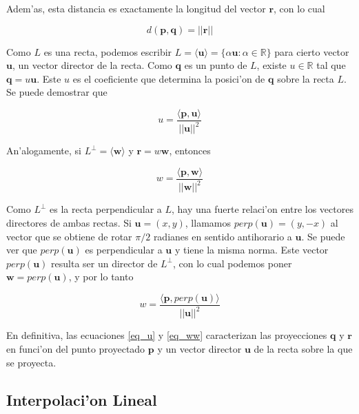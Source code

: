 \noindent
Adem'as, esta distancia es exactamente la longitud del vector $\mathbf{r}$, con lo cual

\begin{equation*}
d(\mathbf{p}, \mathbf{q}) = ||\mathbf{r}||
\label{eq_dist_2}
\end{equation*}

Como $L$ es una recta, podemos escribir $L = \langle \mathbf{u} \rangle = \{\alpha \mathbf{u}: \alpha \in \mathbb{R}\}$ para cierto vector $\mathbf{u}$, un vector director de la recta. Como $\mathbf{q}$ es un punto de $L$, existe $u \in \mathbb{R}$ tal que $\mathbf{q} = u\mathbf{u}$. Este $u$ es el coeficiente que determina la posici'on de $\mathbf{q}$ sobre la recta $L$. Se puede demostrar que 

\begin{equation}
u = \frac{\langle \mathbf{p}, \mathbf{u} \rangle}{||\mathbf{u}||^2}
\label{eq_u}
\end{equation}


An'alogamente, si $L^{\perp} = \langle \mathbf{w} \rangle$ y $\mathbf{r} = w \mathbf{w}$, entonces

\[w = \frac{\langle \mathbf{p}, \mathbf{w}\rangle}{||\mathbf{w}||^2}\]

Como $L^{\perp}$ es la recta perpendicular a $L$, hay una fuerte relaci'on entre los vectores directores de ambas rectas. Si $\mathbf{u} = (x, y)$, llamamos $perp(\mathbf{u}) = (y, -x)$ al vector que se obtiene de rotar $\pi / 2$ radianes en sentido antihorario a $\mathbf{u}$. Se puede ver que $perp(\mathbf{u})$ es perpendicular a $\mathbf{u}$ y tiene la misma norma. Este vector $perp(\mathbf{u})$ resulta ser un director de $L^{\perp}$, con lo cual podemos poner $\mathbf{w} = perp(\mathbf{u})$, y por lo tanto

\begin{equation}
w = \frac{\langle\mathbf{p}, perp(\mathbf{u})\rangle}{||\mathbf{u}||^2}
\label{eq_ww}
\end{equation}

En definitiva, las ecuaciones \ref{eq_u} y \ref{eq_ww} caracterizan las proyecciones $\mathbf{q}$ y $\mathbf{r}$ en funci'on del punto proyectado $\mathbf{p}$ y un vector director $\mathbf{u}$ de la recta sobre la que se proyecta.

\subsection{Interpolaci'on Lineal}

\label{interp}

